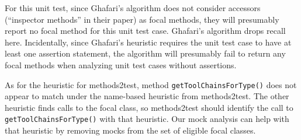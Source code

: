 For this unit test, since Ghafari's algorithm does not consider accessors (``inspector methods'' in their paper) as focal methods, they will presumably report no focal method for this unit test case. Ghafari's algorithm drops recall here.
Incidentally, since Ghafari's heuristic requires the unit test case to have at least one assertion statement, the algorithm will presumably fail to return any focal methods when analyzing unit test cases without assertions.

As for the heuristic for methods2test, method \texttt{getToolChainsForType()} does not appear to match under the name-based heuristic from methods2test. The other heuristic finds calls to the focal class, so methods2test should identify the call to \texttt{getToolChainsForType()} with that heuristic. Our mock analysis can help with that heuristic by removing mocks from the set of eligible focal classes.

\begin{table*}
	\centering
	\caption{Comparison of \% of test cases with reported focal methods by the two automated focal method detection algorithms.}
	\vspace*{.5em}
	\label{tab:focal-method-algorithm-comparison}
\end{table*}


